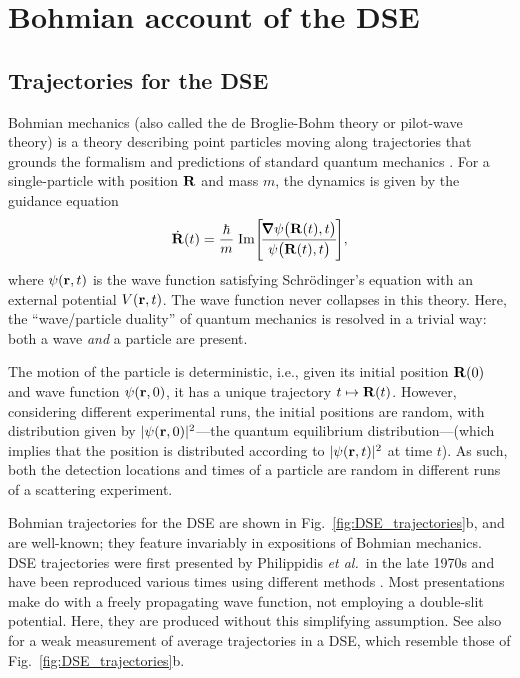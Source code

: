 \documentclass[11pt,a4paper]{article}
\newcommand{\sm}{\kern0.1em}
\begin{document}
\section{Bohmian account of the DSE} \label{sec:bohmian}
\subsection{Trajectories for the DSE}
Bohmian mechanics (also called the de Broglie-Bohm theory or pilot-wave theory) is a theory describing point particles moving along trajectories that grounds the formalism and predictions of standard quantum mechanics \cite{BohmHiley,HollandBook,DurrTeufel,DGZOperators}. For a single-particle with position \(\vb{R}\) and mass \(m\), the dynamics is given by the guidance equation
\begin{equation}\label{eq:guide}
    \dot{\vb{R}}(t)=\frac{\hbar}{m}\sm\Im\!\left[\!\frac{\pmb{\nabla}\psi\big(\vb{R}(t),t\big)}{\psi\big(\vb{R}(t),t\big)}\!\right]\!,
\end{equation}
where \(\psi(\vb{r},t)\) is the wave function satisfying Schr\"odinger's equation with an external potential \(V(\vb{r},t)\). The wave function never collapses in this theory. Here, the ``wave/particle duality'' of quantum mechanics is resolved in a trivial way: both a wave \emph{and} a particle are present. 

The motion of the particle is deterministic, i.e., given its initial position
\(\vb{R}(0)\) and wave function \(\psi(\vb{r},0)\), it has a unique trajectory
$t\mapsto \vb{R}(t)$. However, considering different experimental runs, the initial
positions are random, with distribution given by
\(|\psi(\vb{r},0)|^2\)---the quantum equilibrium distribution---(which implies that the position is distributed according to \(|\psi(\vb{r},t)|^2\) at time $t$). As such, both the detection locations and times of a particle are random in different runs of a scattering experiment. 

Bohmian trajectories for the DSE are shown in Fig.\ \ref{fig:DSE_trajectories}b, and are well-known; they feature invariably in expositions of Bohmian mechanics. DSE trajectories were first presented by Philippidis \emph{et al.}\ in the late 1970s \cite{Dewdney} and have been reproduced various times using different methods \cite{BohmDS,Sanz,holland2,gondran}. Most presentations make do with a freely propagating wave function, not employing a double-slit potential. Here, they are produced without this simplifying assumption. See also \cite{Kocsis} for a weak measurement of average trajectories in a DSE, which resemble those of Fig.\ \ref{fig:DSE_trajectories}b. 
\end{document}
